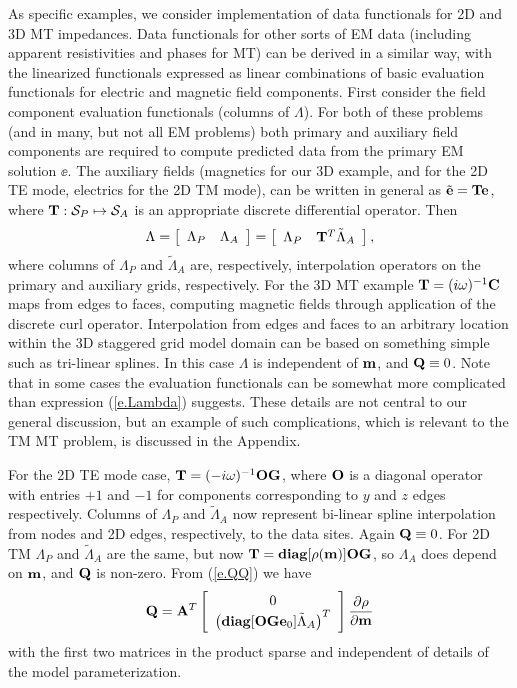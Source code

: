 As specific examples, we consider implementation of
data functionals for 2D and 3D MT impedances.
Data functionals for other sorts of EM data (including
apparent resistivities and phases for MT)
can be derived in a similar way, with the linearized functionals
expressed as linear combinations of basic evaluation
functionals for electric and magnetic field components.
First consider the field component evaluation functionals
(columns of $\Lambda$).  For both of
these problems (and in many, but not all EM problems)
both primary and auxiliary field components are required
to compute predicted data from the primary 
EM solution $\ee$.  The auxiliary
fields (magnetics for our 3D example, and for the 2D TE mode,
electrics for the 2D TM mode), can be written in general
as $\tilde {{\bf e}} = {\bf T} {\bf e}$, where ${\bf T}:{\cal S}_P \mapsto {\cal S}_A$
is an appropriate discrete differential operator.  Then
\begin{equation}
\label{e.Lambda}
\Lambda = \left [ 
\begin{array}{c c}
\Lambda_P & \Lambda_A 
\end{array}
\right ] = 
\left [ 
\begin{array}{c c}
\Lambda_P & { {\bf T}^T \tilde \Lambda_A }
\end{array}
\right ] ,
\end{equation}
where columns of $ \Lambda_P$ and $\tilde \Lambda_A$  are,
respectively, interpolation operators on the 
primary and auxiliary grids, respectively.
For the 3D MT example ${\bf T} = (i\omega)^{-1}{\bf C}$
maps from edges to faces, computing magnetic fields
through application of the discrete curl operator.
Interpolation
from edges and faces to an arbitrary location within
the 3D staggered grid model domain can be based on  something simple 
such as tri-linear splines.
In this case $\Lambda$ is independent of ${\bf m}$, and ${\bf Q} \equiv 0$.
Note that in some cases the evaluation functionals
can be somewhat more complicated than expression
(\ref{e.Lambda}) suggests.  
These details are not central to our general discussion,
but an example of such complications, which is relevant
to the TM MT problem, is discussed in the Appendix.

For the 2D TE mode case, ${\bf T} = (-i\omega)^{-1}{\bf O}{\bf G}$, where ${\bf O}$
is a diagonal operator with entries $+1$ and $-1$ for components
corresponding to $y$ and $z$ edges respectively.
Columns of 
$\Lambda_P$ and $\tilde \Lambda_A$ now represent bi-linear
spline interpolation from nodes and 2D edges,
respectively, to the data sites.
Again ${\bf Q} \equiv 0$.  For 2D TM 
$\Lambda_P$ and $\tilde \Lambda_A$
are the same, but now
${\bf T} = {\bf diag} [ \rho ({\bf m}) ] {\bf O} {\bf G} $, so
$\Lambda_A$ does depend on ${\bf m}$, and ${\bf Q}$ is non-zero.
From (\ref{e.QQ}) we have
\begin{equation}
\label{e.Qtilde}
{\bf Q} = 
{\bf A}^T \left [
\begin{array}{c}
0 \\
\left( {\bf diag} 
[ {\bf O} {\bf G} {\bf e}_0 ] \tilde \Lambda_A \right)^T
\end{array}
\right ]
\frac{\partial \rho}{\partial {\bf m}}
\end{equation}
with the first two matrices in the product sparse and independent of
details of the model parameterization.

